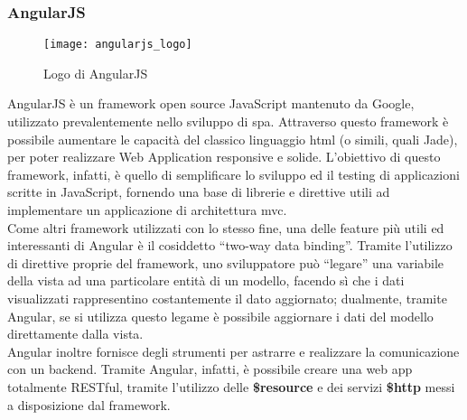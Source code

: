 \subsubsection{AngularJS}
\begin{figure}[H] 
    \centering 
    \texttt{[image: angularjs\_logo]} 
    \caption{Logo di AngularJS}
\end{figure}
AngularJS è un framework open source JavaScript mantenuto da Google, utilizzato prevalentemente nello sviluppo di \gls{spa}. Attraverso questo framework è possibile aumentare le capacità del classico linguaggio \gls{html} (o simili, quali Jade), per poter realizzare Web Application responsive e solide. 
L’obiettivo di questo framework, infatti, è quello di semplificare lo sviluppo ed il testing di applicazioni scritte in JavaScript, fornendo una base di librerie e direttive utili ad implementare un applicazione di architettura \gls{mvc}.\\
Come altri framework utilizzati con lo stesso fine, una delle feature più utili ed interessanti di Angular è il cosiddetto “two-way data binding”. Tramite l’utilizzo di direttive proprie del framework, uno sviluppatore può “legare” una variabile della vista ad una particolare entità di un modello, facendo sì che i dati visualizzati rappresentino costantemente il dato aggiornato; dualmente, tramite Angular, se si utilizza questo legame è possibile aggiornare i dati del modello direttamente dalla vista.\\
Angular inoltre fornisce degli strumenti per astrarre e realizzare la comunicazione con un backend. Tramite Angular, infatti, è possibile creare una web app totalmente RESTful, tramite l’utilizzo delle \textbf{\$resource} e dei servizi \textbf{\$http} messi a disposizione dal framework.

